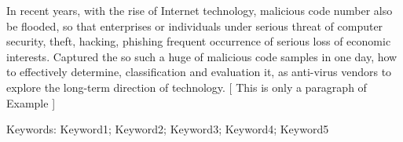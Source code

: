 In recent years, with the rise of Internet technology, malicious code number also be flooded, so that enterprises or individuals under serious threat of computer security, theft, hacking, phishing frequent occurrence of serious loss of economic interests. Captured the so such a huge of malicious code samples in one day, how to effectively determine, classification and evaluation it, as anti-virus vendors to explore the long-term direction of technology. [ This is only a paragraph of Example ]


Keywords: Keyword1; Keyword2; Keyword3; Keyword4; Keyword5

